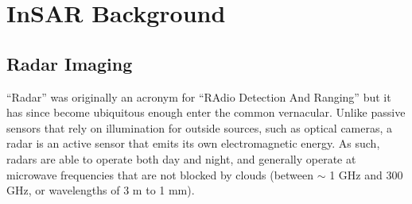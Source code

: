 
\chapter{InSAR Background}
\label{CHAP:3}




\section{Radar Imaging}
\label{sec:ch3-radar}

``Radar'' was originally an acronym for ``RAdio Detection And Ranging'' but it has since become ubiquitous enough enter the common vernacular. Unlike passive sensors that rely on illumination for outside sources, such as optical cameras, a radar is an active sensor that emits its own electromagnetic energy.  As such, radars are able to operate both day and night, and generally operate at microwave frequencies that are not blocked by clouds (between $\sim$ 1 GHz and 300 GHz, or wavelengths of 3 m to 1 mm).


